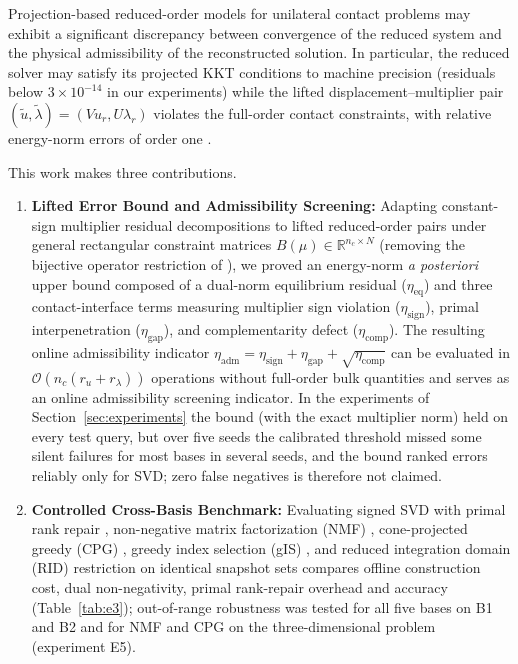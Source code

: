 \documentclass[11pt,a4paper]{article}
\providecommand{\tightlist}{\setlength{\itemsep}{0pt}\setlength{\parskip}{0pt}}
\begin{document}
Projection-based reduced-order models for unilateral contact problems may exhibit a significant discrepancy between convergence of the reduced system and the physical admissibility of the reconstructed solution. In particular, the reduced solver may satisfy its projected KKT conditions to machine precision (residuals below \(3 \times 10^{-14}\) in our experiments) while the lifted displacement--multiplier pair \((\tilde{u}, \tilde{\lambda}) = (V u_r, U \lambda_r)\) violates the full-order contact constraints, with relative energy-norm errors of order one \cite{balajewicz2016projection, benaceur2020reduced}.

This work makes three contributions.

\begin{enumerate}
\def\labelenumi{\arabic{enumi}.}
\tightlist
\item
  \textbf{Lifted Error Bound and Admissibility Screening:} Adapting constant-sign multiplier residual decompositions \cite{hild2007residual, dabaghi2020posteriori, banz2024generic, fontana2024guaranteed, banz2026posteriori} to lifted reduced-order pairs under general rectangular constraint matrices \(B(\mu) \in \mathbb{R}^{n_c \times N}\) (removing the bijective operator restriction of \cite{zhang2014duality}), we proved an energy-norm \emph{a posteriori} upper bound composed of a dual-norm equilibrium residual (\(\eta_{\text{eq}}\)) and three contact-interface terms measuring multiplier sign violation (\(\eta_{\text{sign}}\)), primal interpenetration (\(\eta_{\text{gap}}\)), and complementarity defect (\(\eta_{\text{comp}}\)). The resulting online admissibility indicator \(\eta_{\text{adm}} = \eta_{\text{sign}} + \eta_{\text{gap}} + \sqrt{\eta_{\text{comp}}}\) can be evaluated in \(\mathcal{O}(n_c (r_u + r_\lambda))\) operations without full-order bulk quantities and serves as an online admissibility screening indicator. In the experiments of Section~\ref{sec:experiments} the bound (with the exact multiplier norm) held on every test query, but over five seeds the calibrated threshold missed some silent failures for most bases in several seeds, and the bound ranked errors reliably only for SVD; zero false negatives is therefore not claimed.
\item
  \textbf{Controlled Cross-Basis Benchmark:} Evaluating signed SVD with primal rank repair \cite{leberre2022condition}, non-negative matrix factorization (NMF) \cite{balajewicz2016projection}, cone-projected greedy (CPG) \cite{benaceur2020reduced}, greedy index selection (gIS) \cite{sambataro2026model, kollepara2024sparse}, and reduced integration domain (RID) restriction \cite{fauque2018hybrid, leberre2022condition} on identical snapshot sets compares offline construction cost, dual non-negativity, primal rank-repair overhead and accuracy (Table~\ref{tab:e3}); out-of-range robustness was tested for all five bases on B1 and B2 and for NMF and CPG on the three-dimensional problem (experiment E5).

\end{enumerate}
\end{document}
